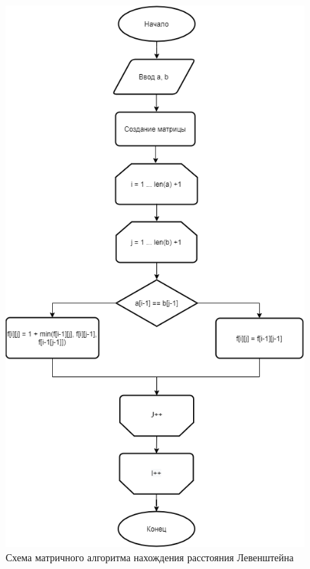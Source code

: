 \documentclass[a4paper, 12pt]{article}
\begin{document}
\begin{flushleft}
\begin{figure}[h]
		\centering \includegraphics[scale=0.6]{diaglev}
		\centering \caption{Схема матричного алгоритма нахождения расстояния Левенштейна}
	\end{figure}
	\clearpage
	\newpage
	\begin{figure}[h]

\end{figure}
\end{flushleft}
\end{document}
